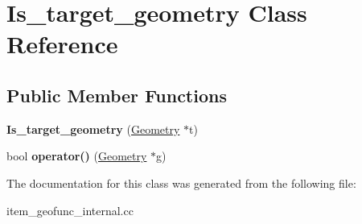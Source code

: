 \hypertarget{classIs__target__geometry}{}\section{Is\+\_\+target\+\_\+geometry Class Reference}
\label{classIs__target__geometry}
\subsection*{Public Member Functions}
\begin{DoxyCompactItemize}
\item 
\mbox{\label{classIs__target__geometry_a18d7c3631887d15dd9e6fd5aaf37718b}} 
{\bfseries Is\+\_\+target\+\_\+geometry} (\mbox{\hyperlink{classGeometry}{Geometry}} $\ast$t)
\item 
\mbox{\label{classIs__target__geometry_ab77cbbdc56cf44357b601584d1c7b39b}} 
bool {\bfseries operator()} (\mbox{\hyperlink{classGeometry}{Geometry}} $\ast$g)
\end{DoxyCompactItemize}


The documentation for this class was generated from the following file\+:\begin{DoxyCompactItemize}
\item 
item\+\_\+geofunc\+\_\+internal.\+cc\end{DoxyCompactItemize}
